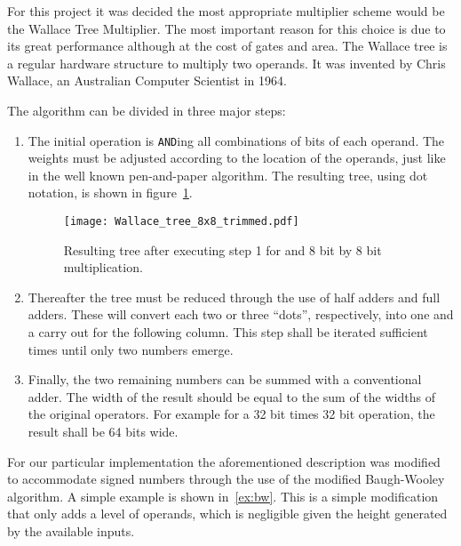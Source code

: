 For this project it was decided the most appropriate multiplier scheme would be the Wallace Tree Multiplier. The most important reason for this choice is due to its great performance although at the cost of gates and area.
The Wallace tree is a regular hardware structure to multiply two operands. It was invented by Chris Wallace, an Australian Computer Scientist in 1964.

The algorithm can be divided in three major steps:
\begin{enumerate}
\item The initial operation is \texttt{AND}ing all combinations of bits of each operand. The weights must be adjusted according to the location of the operands, just like in the well known pen-and-paper algorithm. The resulting tree, using dot notation, is shown in figure~\ref{fig:wallace_tree}.

\begin{figure}[H]
\centering
\texttt{[image: Wallace\_tree\_8x8\_trimmed.pdf]}
\caption{Resulting tree after executing step 1 for and 8 bit by 8 bit multiplication.}
\label{fig:wallace_tree}
\end{figure}

\item Thereafter the tree must be reduced through the use of half adders and full adders. These will convert each two or three ``dots'', respectively, into one and a carry out for the following column. This step shall be iterated sufficient times until only two numbers emerge.

\item Finally, the two remaining numbers can be summed with a conventional adder. The width of the result should be equal to the sum of the widths of the original operators. For example for a 32 bit times 32 bit operation, the result shall be 64 bits wide. 
\end{enumerate}  

For our particular implementation the aforementioned description was modified to accommodate signed numbers through the use of the modified Baugh-Wooley algorithm. A simple example is shown in~\ref{ex:bw}. This is a simple modification that only adds a level of operands, which is negligible given the height generated by the available inputs. 


